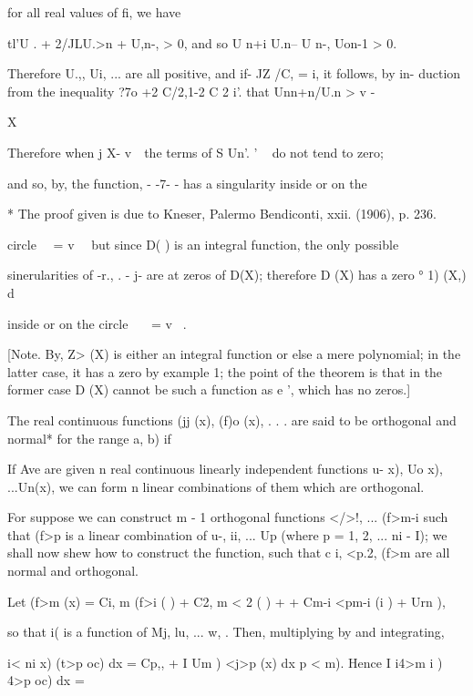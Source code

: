 {for all real values of fi, we have

tl'U . + 2/JLU.>n + U,n-, > 0, and so U n+i U.n-- U n-, Uon-1 > 0.

Therefore U.,, Ui, ... are all positive, and if- JZ /C, = i, it
follows, by in- duction from the inequality ?7o +2 C/2,1-2 C 2 i'.
that Unn+n/U.n > v -

X

Therefore when j X- v~\ the terms of S Un'. ' ~ do not tend to zero;

and so, by, the function, - -7- - has a singularity inside or
on the

* The proof given is due to Kneser, Palermo Bendiconti, xxii. (1906),
p. 236.

%
%

circle \ \ = v~ \ but since D( ) is an integral function, the only
possible

sinerularities of -r., . - j- are at zeros of D(X); therefore D (X)
has a zero ° 1) (X,) d\

inside or on the circle \ \ \ = v~ .

[Note. By, Z> (X) is either an integral function or else a
mere polynomial; in the latter case, it has a zero by example
1; the point of the theorem is that in the former case D (X) cannot
be such a function as e ', which has no zeros.]


The real continuous functions (jj (x), (f)o (x), . . . are said to be
orthogonal and normal* for the range a, b) if

If Ave are given n real continuous linearly independent functions u-
x), Uo x), ...Un(x), we can form n linear combinations of them which
are orthogonal.

For suppose we can construct m - 1 orthogonal functions </>!, ...
(f>m-i such that (f>p is a linear combination of u-, ii, ... Up
(where p = 1, 2, ... ni - I); we shall now shew how to construct the
function, such that c i, <p.2,  (f>m are all normal and
orthogonal.

Let (f>m (x) = Ci, m (f>i ( ) + C2, m < 2 ( ) +  + Cm-i <pm-i (i )
+ Urn ),

so that i( is a function of Mj, lu, ... w, . Then, multiplying by and
integrating,

i< ni x) (t>p oc) dx = Cp,, + I Um ) <j>p (x) dx p < m). Hence I i4>m
i ) 4>p oc) dx =

}
